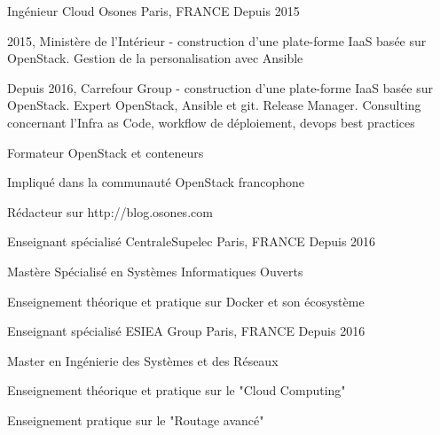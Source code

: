 

\begin{cventries}

  \cventry
    {Ingénieur Cloud} %
    {Osones} %
    {Paris, FRANCE} %
    {Depuis 2015} %
    {
      \begin{cvitems} %
        \item {2015, Ministère de l'Intérieur - construction d'une plate-forme IaaS
          basée sur OpenStack. Gestion de la personalisation avec Ansible}
        \item {Depuis 2016, Carrefour Group - construction d'une plate-forme IaaS basée sur OpenStack.
          Expert OpenStack, Ansible et git. Release Manager.
          Consulting concernant l'Infra as Code, workflow de déploiement, devops best practices}
        \item {Formateur OpenStack et conteneurs}
      \item {Impliqué dans la communauté OpenStack francophone}
      \item {Rédacteur sur http://blog.osones.com}
      \end{cvitems}
    }

  \cventry
    {Enseignant spécialisé} %
    {CentraleSupelec}
    {Paris, FRANCE} %
    {Depuis 2016} %
    {
      \begin{cvitems} %
      \item {Mastère Spécialisé en Systèmes Informatiques Ouverts}
      \item {Enseignement théorique et pratique sur Docker et son écosystème}
      \end{cvitems}
    }

  \cventry
    {Enseignant spécialisé} %
    {ESIEA Group}
    {Paris, FRANCE} %
    {Depuis 2016} %
    {
      \begin{cvitems} %
      \item{Master en Ingénierie des Systèmes et des Réseaux} %
        \item {Enseignement théorique et pratique sur le "Cloud Computing"}
        \item {Enseignement pratique sur le "Routage avancé"}
      \end{cvitems}
    }


\end{cventries}
